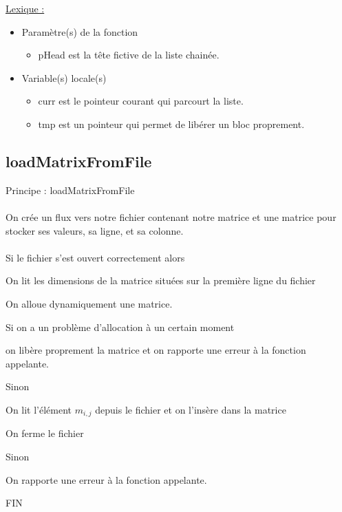 \documentclass[a4paper]{article}
\newcommand\tab[1][1cm]{\hspace*{#1}}
\begin{document}
\underline{Lexique :}
\begin{itemize}
\item Paramètre(s) de la fonction  
\begin{itemize}
\item pHead est la tête fictive de la liste chainée.
\end{itemize}
\item Variable(s) locale(s)
\begin{itemize}
\item curr est le pointeur courant qui parcourt la liste.
\item tmp est un pointeur qui permet de libérer un bloc proprement.
\end{itemize}
\end{itemize}

\subsection{loadMatrixFromFile}
\begin{algorithm}
Principe : loadMatrixFromFile
\\
\\
\tab On crée un flux vers notre fichier contenant notre matrice et une matrice pour stocker ses
\tab valeurs, sa ligne, et sa colonne. 
\\
\\
\tab Si le fichier s'est ouvert correctement alors 

\tab \tab On lit les dimensions de la matrice situées sur la première ligne du fichier

\tab \tab On alloue dynamiquement une matrice.

\tab \tab Si on a un problème d'allocation à un certain moment 

\tab \tab \tab on libère proprement la matrice et on rapporte une erreur à la fonction appelante.

\tab \tab Sinon 

\tab \tab \tab On lit l'élément $m_{i,j}$ depuis le fichier et on l'insère dans la matrice 

\tab \tab  On ferme le fichier 

\tab Sinon  

\tab \tab On rapporte une erreur à la fonction appelante.

FIN
\end{algorithm}
\end{document}
